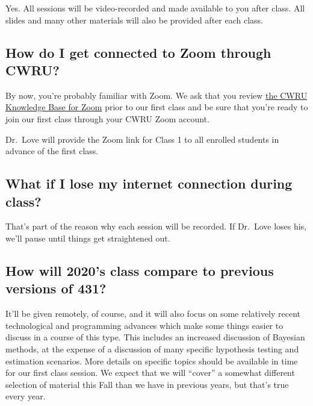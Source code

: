 \documentclass[
]{book}
\begin{document}
Yes. All sessions will be video-recorded and made available to you after class. All slides and many other materials will also be provided after each class.

\hypertarget{how-do-i-get-connected-to-zoom-through-cwru}{%
\subsection{How do I get connected to Zoom through CWRU?}\label{how-do-i-get-connected-to-zoom-through-cwru}}

By now, you're probably familiar with Zoom. We ask that you review \href{https://case.edu/utech/help/knowledge-base/zoom/zoom-information}{the CWRU Knowledge Base for Zoom} prior to our first class and be sure that you're ready to join our first class through your CWRU Zoom account.

Dr.~Love will provide the Zoom link for Class 1 to all enrolled students in advance of the first class.

\hypertarget{what-if-i-lose-my-internet-connection-during-class}{%
\subsection{What if I lose my internet connection during class?}\label{what-if-i-lose-my-internet-connection-during-class}}

That's part of the reason why each session will be recorded. If Dr.~Love loses his, we'll pause until things get straightened out.

\hypertarget{how-will-2020s-class-compare-to-previous-versions-of-431}{%
\subsection{How will 2020's class compare to previous versions of 431?}\label{how-will-2020s-class-compare-to-previous-versions-of-431}}

It'll be given remotely, of course, and it will also focus on some relatively recent technological and programming advances which make some things easier to discuss in a course of this type. This includes an increased discussion of Bayesian methods, at the expense of a discussion of many specific hypothesis testing and estimation scenarios. More details on specific topics should be available in time for our first class session. We expect that we will ``cover'' a somewhat different selection of material this Fall than we have in previous years, but that's true every year.
\end{document}

